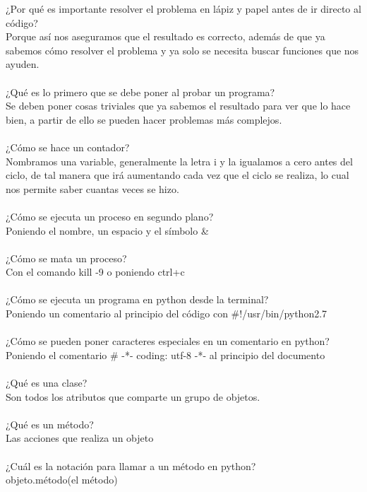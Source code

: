 \documentclass{book}
\begin{document}
	¿Por qué es importante resolver el problema en lápiz y papel antes de ir directo al código?\\
	Porque así nos aseguramos que el resultado es correcto, además de que ya sabemos cómo resolver el problema y ya solo se necesita buscar funciones que nos ayuden.\\
	\\
	¿Qué es lo primero que se debe poner al probar un programa?\\
	Se deben poner cosas triviales que ya sabemos el resultado para ver que lo hace bien, a partir de ello se pueden hacer problemas más complejos.\\
	\\
	¿Cómo se hace un contador?\\
	Nombramos una variable, generalmente la letra i y la igualamos a cero antes del ciclo, de tal manera que irá aumentando cada vez que el ciclo se realiza, lo cual nos permite saber cuantas veces se hizo. \\
	\\
	¿Cómo se ejecuta un proceso en segundo plano?\\
	Poniendo el nombre, un espacio y el símbolo \&\\
	\\
	¿Cómo se mata un proceso?\\
	Con el comando kill -9 o poniendo ctrl+c\\
	\\
	¿Cómo se ejecuta un programa en python desde la terminal?\\
	Poniendo un comentario al principio del código con \#!/usr/bin/python2.7\\
	\\
	¿Cómo se pueden poner caracteres especiales en un comentario en python?\\
	Poniendo el comentario \# -*- coding: utf-8 -*- al principio del documento\\
	\\
	¿Qué es una clase?\\
	Son todos los atributos que comparte un grupo de objetos.\\
	\\
	¿Qué es un método?\\
	Las acciones que realiza un objeto\\
	\\
	¿Cuál es la notación para llamar a un método en python?\\
	objeto.método(el método)\\
	\\
\end{document}
